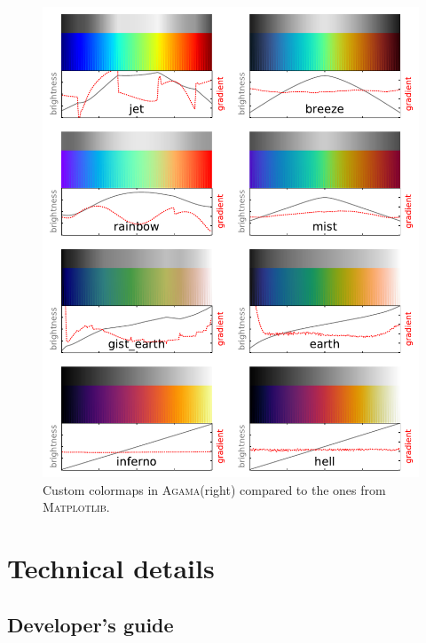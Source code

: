 \documentclass[12pt]{article}
\newcommand{\Agama}{\textsc{Agama}\xspace}
\begin{document}
\begin{figure}
\begin{center}
\includegraphics{Colormaps.pdf}
\end{center}
\vspace*{-5mm}
\caption{Custom colormaps in \Agama (right) compared to the ones from \textsc{Matplotlib}.
}  \label{fig:colormaps}
\end{figure}

\newpage
\appendix

\section{Technical details}

\subsection{Developer's guide}  \label{sec:DeveloperGuide}
\end{document}
